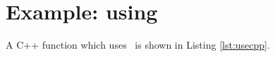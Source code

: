 \documentclass[10pt]{article}
\begin{document}
%

\section{Example: using \libint}

A C++ function which uses \LIBINT\ is shown in Listing \ref{lst:usecpp}.
\end{document}
